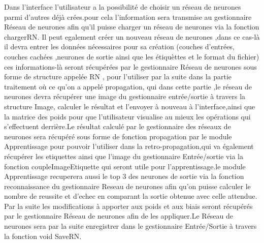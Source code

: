 \documentclass{article}
\begin{document}
	Dans l'interface l'utilisateur a la possibilité de choisir un réseau de neurones parmi d'autres déjà crées.pour cela l'information sera transmise au gestionnaire Réseau de neurones afin qu'il puisse charger un réseau de neurones via la fonction chargerRN.
Il peut egalement créer un nouveau réseau de neurones ,dans ce cas-là il devra entrer les données nécessaires pour sa création (couches d'entrées, couches cachées ,neurones de sortie ainsi que les étiquèttes et le format du fichier) ces informations-là seront récupérées par le gestionnaire Réseau de neurones sous forme de structure appelée RN , pour l'utiliser par la suite dans la partie traitement où ce qu'on a appelé propagation, qui dans cette partie ,le réseau de neurones devra récupérer une image du gestionnaire entrée/sortie à travers la structure Image, calculer le résultat et l'envoyer à nouveau à l'interface,ainsi que la matrice des poids pour que l'utilisateur visualise au mieux les opérations qui s'effectuent derrière.Le résultat calculé par le gestionnaire des réseaux de neurones sera récupéré sous forme de fonction propagation par le module Apprentissage pour pouvoir l'utiliser dans la retro-propagation,qui va également récupérer les etiquettes ainsi que l'image du gestionnaire Entrée/sortie via la fonction coupleImageEtiquette qui seront utile pour l'apprentissage.le module Apprentissage recuperera aussi le top 3 des neurones de sortie via la fonction reconnaissance du gestionnaire Reseau de neurones afin qu'on puisse calculer le nombre de reussite et d'echec en comparant la sortie obtenue avec celle attendue.
Par la suite les modifications à apporter aux poids et aux biais seront récupérés par le gestionnaire Réseau de neurones afin de les appliquer.Le Réseau de neurones sera par la suite enregistrer dans le gestionnaire Entrée/Sortie à travers la fonction void SaveRN.
		
		
\end{document}
